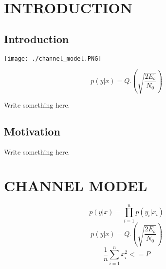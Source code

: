 \documentclass[a4paper, 13pt]{report}
\begin{document}
\chapter{INTRODUCTION}
\section{Introduction}



\begin{center}
    \texttt{[image: ./channel\_model.PNG]}\\[1cm]
\end{center}
\begin{equation}
    p(y|x) = Q.(\sqrt{\frac{2E_b}{N_0}})
\end{equation}


\par Write something here.\\
\section{Motivation}
\par Write something here.\\

\chapter{CHANNEL MODEL}
\begin{equation}
    p(y|x) = \prod_{i=1}^{n} p(y_i|x_i)
\end{equation}
\begin{equation}
    p(y|x) = Q.(\sqrt{\frac{2E_b}{N_0}})
\end{equation}
\begin{equation}
    \frac{1}{n}\sum_{i=1}^{n}x_i^2 <= P
\end{equation}
\end{document}
